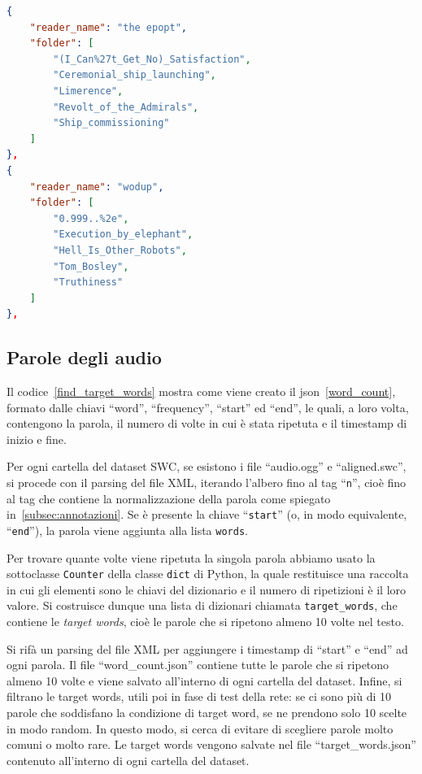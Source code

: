 \documentclass[12pt,a4paper,titlepage]{article}
\begin{document}
\begin{lstlisting}[language=json,firstnumber=1, caption=Formato del file readers\_paths.json, label=JSON_lettori,captionpos=b]
{
	"reader_name": "the epopt",
	"folder": [
		"(I_Can%27t_Get_No)_Satisfaction",
		"Ceremonial_ship_launching",
		"Limerence",
		"Revolt_of_the_Admirals",
		"Ship_commissioning"
	]
},
{
	"reader_name": "wodup",
	"folder": [
		"0.999..%2e",
		"Execution_by_elephant",
		"Hell_Is_Other_Robots",
		"Tom_Bosley",
		"Truthiness"
	]
},
\end{lstlisting}

\subsection{Parole degli audio}
\label{subsec:parole}
Il codice~\ref{find_target_words} mostra come viene creato il json~\ref{word_count}, formato dalle chiavi ``word'', ``frequency'', ``start'' ed ``end'', le quali, a loro volta, contengono la parola, il numero di volte in cui è stata ripetuta e il timestamp di inizio e fine.

Per ogni cartella del dataset SWC, se esistono i file ``audio.ogg'' e ``aligned.swc'', si procede con il parsing del file XML, iterando l'albero fino al tag  ``\texttt{n}'', cioè fino al tag che contiene la normalizzazione della parola come spiegato in~\ref{subsec:annotazioni}. Se è presente la chiave ``\texttt{start}'' (o, in modo equivalente, ``\texttt{end}''), la parola viene aggiunta alla lista \texttt{words}.

Per trovare quante volte viene ripetuta la singola parola abbiamo usato la sottoclasse \texttt{Counter} della classe \texttt{dict} di Python, la quale restituisce una raccolta in cui gli elementi sono le chiavi del dizionario e il numero di ripetizioni è il loro valore. Si costruisce dunque una lista di dizionari chiamata \texttt{target\_words}, che contiene le \textit{target words}, cioè le parole che si ripetono almeno 10 volte nel testo.~\cite{salamon:Few-Shot}

Si rifà un parsing del file XML per aggiungere i timestamp di ``start'' e ``end'' ad ogni parola. Il file ``word\_count.json'' contiene tutte le parole che si ripetono almeno 10 volte e viene salvato all'interno di ogni cartella del dataset. Infine, si filtrano le target words, utili poi in fase di test della rete: se ci sono più di 10 parole che soddisfano la condizione di target word, se ne prendono solo 10 scelte in modo random. In questo modo, si cerca di evitare di scegliere parole molto comuni o molto rare. Le target words vengono salvate nel file ``target\_words.json'' contenuto all'interno di ogni cartella del dataset. 
\end{document}
